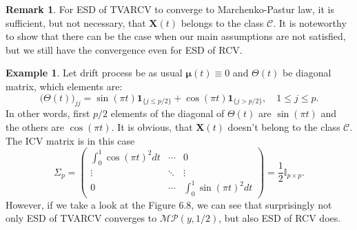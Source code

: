 \documentclass[a4paper,11pt]{book}
\theoremstyle{plain}
\theoremstyle{definition}
\newtheorem{exmp}[thm]{Example}
\newtheorem{rmrk}[thm]{Remark}
\begin{document}
    \begin{rmrk}
    	For ESD of TVARCV to converge to Marchenko-Pastur law, it is sufficient, but not necessary, that $\mathbf{X}(t)$ belongs to the class $\mathcal{C}$. It is noteworthy to show that there can be the case when our main assumptions are not satisfied, but we still have the convergence even for ESD of RCV.
    \end{rmrk}
    \begin{exmp} \label{counter exmpl}
    	Let drift process be as usual $\boldsymbol{\mu}(t) \equiv 0$ and $\Theta(t)$ be diagonal matrix, which elements are:
    	\[ \Big(\Theta(t)\Big)_{jj} = \sin(\pi t) \mathbf{1}_{\{j \leq p/2\}} + \cos(\pi t) \mathbf{1}_{\{j > p/2\}}, \quad 1 \leq j \leq p.  \]
    	In other words, first $p/2$ elements of the diagonal of $\Theta(t)$ are $\sin(\pi t)$ and the others are $\cos(\pi t)$. It is obvious, that $\mathbf{X}(t)$ doesn't belong to the class $\mathcal{C}$. The ICV matrix is in this case
    	\[ \Sigma_p = \begin{pmatrix}
    	\int_{0}^{1} \cos(\pi t)^2 dt & \cdots & 0 \\
    	\vdots & \ddots & \vdots \\
    	0 & \cdots & \int_{0}^{1} \sin(\pi t)^2 dt
    	\end{pmatrix} 
    	= \frac{1}{2} \mathbb{I}_{p \times p}. \]
    	However, if we take a look at the Figure 6.8, we can see that surprisingly not only ESD of TVARCV converges to $\mathcal{MP}(y, 1/2)$, but also ESD of RCV does.
    \end{exmp}
    
\end{document}
